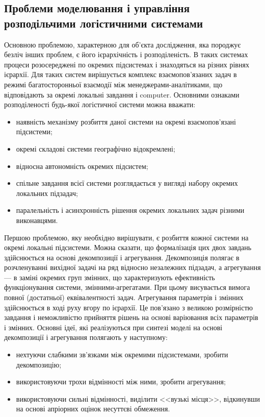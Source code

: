 \subsection{Проблеми моделювання і управління розподільчими логістичними системами}
Основною проблемою, характерною для об'єкта дослідження, яка породжує безліч інших проблем, є його ієрархічність і розподіленість. 
В таких системах процеси розосереджені по окремих підсистемах і знаходяться на різних рівнях ієрархії. 
Для таких систем вирішується комплекс взаємопов'язаних задач в режимі багатосторонньої взаємодії між менеджерами-аналітиками, що відповідають за окремі локальні завдання і \acrshort{computer}. 
Основними ознаками розподіленості будь-якої логістичної системи можна вважати:
\begin{itemize}
	\item наявність механізму розбиття даної системи на окремі взаємопов'язані підсистеми;
	\item окремі складові системи географічно відокремлені;
	\item відносна автономність окремих підсистем;
	\item спільне завдання всієї системи розглядається у вигляді набору окремих локальних підзадач;
	\item паралельність і асинхронність рішення окремих локальних задач різними виконавцями.
\end{itemize}

Першою проблемою, яку необхідно вирішувати, є розбиття кожної системи на окремі локальні підсистеми. 
Можна сказати, що формалізація цих двох завдань здійснюється на основі декомпозиції і агрегування. 
Декомпозиція полягає в розчленуванні вихідної задачі на ряд відносно незалежних підзадач, а агрегування --- в заміні окремих груп змінних, що характеризують ефективність функціонування системи, змінними-агрегатами. 
При цьому висувається вимога повної (достатньої) еквівалентності задач. 
Агрегування параметрів і змінних здійснюється в ході руху вгору по ієрархії. 
Це пов'язано з великою розмірністю завдання і неможливістю прийняття рішень на основі варіювання всіх параметрів і змінних. 
Основні ідеї, які реалізуються при синтезі моделі на основі декомпозиції і агрегування полягають у наступному:
\begin{itemize}
\item нехтуючи слабкими зв'язками між окремими підсистемами, зробити декомпозицію;
\item використовуючи трохи відмінності між ними, зробити агрегування;
\item використовуючи сильні відмінності, виділити <<вузькі місця>>, відкинувши на основі апріорних оцінок несуттєві обмеження.
\end{itemize}

